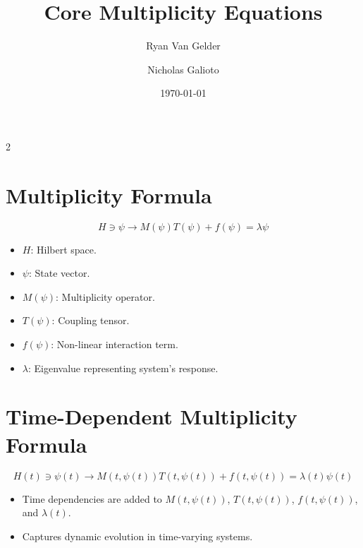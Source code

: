 \documentclass{article}
\theoremstyle{plain}
\begin{document}
\title{Core Multiplicity Equations}
\author[1]{Ryan Van Gelder}
\author[2]{Nicholas Galioto}
\date{\today}

\maketitle
 \begin{multicols}{2}
\begin{singlespace}
\tableofcontents
\end{singlespace}
\end{multicols}
\section{Multiplicity Formula}
\begin{equation}
H \ni \psi \to M(\psi)T(\psi) + f(\psi) = \lambda \psi
\end{equation}
\begin{itemize}
    \item \( H \): Hilbert space.
    \item \( \psi \): State vector.
    \item \( M(\psi) \): Multiplicity operator.
    \item \( T(\psi) \): Coupling tensor.
    \item \( f(\psi) \): Non-linear interaction term.
    \item \( \lambda \): Eigenvalue representing system's response.
\end{itemize}

\section{Time-Dependent Multiplicity Formula}
\begin{equation}
H(t) \ni \psi(t) \to M(t, \psi(t))T(t, \psi(t)) + f(t, \psi(t)) = \lambda(t)\psi(t)
\end{equation}
\begin{itemize}
    \item Time dependencies are added to \( M(t, \psi(t)) \), \( T(t, \psi(t)) \), \( f(t, \psi(t)) \), and \( \lambda(t) \).
    \item Captures dynamic evolution in time-varying systems.
\end{itemize}
\end{document}
